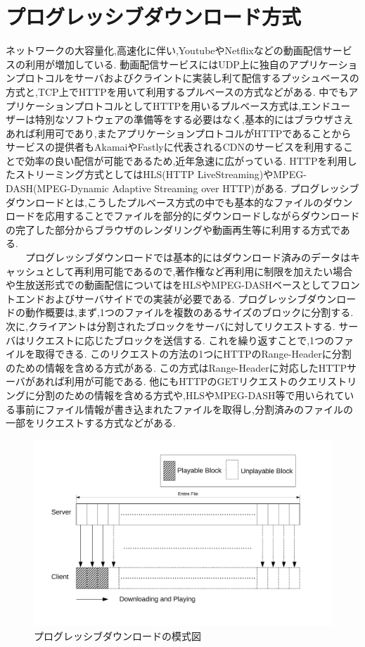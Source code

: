 \documentclass[a4j,12pt]{gradthesis_utf8}
\begin{document}
\section{プログレッシブダウンロード方式}
ネットワークの大容量化,高速化に伴い,Youtube\cite{youtube}やNetflix\cite{netflix}などの動画配信サービスの利用が増加している.
動画配信サービスにはUDP上に独自のアプリケーションプロトコルをサーバおよびクライントに実装し利て配信するプッシュベースの方式と,TCP上でHTTPを用いて利用するプルベースの方式などがある.
中でもアプリケーションプロトコルとしてHTTPを用いるプルベース方式は,エンドユーザーは特別なソフトウェアの準備等をする必要はなく,基本的にはブラウザさえあれば利用可であり,またアプリケーションプロトコルがHTTPであることからサービスの提供者もAkamaiやFastlyに代表されるCDNのサービスを利用することで効率の良い配信が可能であるため,近年急速に広がっている.
HTTPを利用したストリーミング方式としてはHLS(HTTP LiveStreaming)\cite{hls}やMPEG-DASH(MPEG-Dynamic Adaptive Streaming over HTTP)\cite{dash}がある.
プログレッシブダウンロードとは,こうしたプルベース方式の中でも基本的なファイルのダウンロードを応用することでファイルを部分的にダウンロードしながらダウンロードの完了した部分からブラウザのレンダリングや動画再生等に利用する方式である.\\
\ \ \ \ プログレッシブダウンロードでは基本的にはダウンロード済みのデータはキャッシュとして再利用可能であるので,著作権など再利用に制限を加えたい場合や生放送形式での動画配信についてはをHLSやMPEG-DASHベースとしてフロントエンドおよびサーバサイドでの実装が必要である.
プログレッシブダウンロードの動作概要は,まず,1つのファイルを複数のあるサイズのブロックに分割する.
次に,クライアントは分割されたブロックをサーバに対してリクエストする.
サーバはリクエストに応じたブロックを送信する.
これを繰り返すことで,1つのファイルを取得できる.
このリクエストの方法の1つにHTTPのRange-Headerに分割のための情報を含める方式がある.
この方式はRange-Headerに対応したHTTPサーバがあれば利用が可能である.
他にもHTTPのGETリクエストのクエリストリングに分割のための情報を含める方式や,HLSやMPEG-DASH等で用いられている事前にファイル情報が書き込まれたファイルを取得し,分割済みのファイルの一部をリクエストする方式などがある.

\begin{figure}[h]
	\centering
	\includegraphics[width=16cm]{figure/p-dl.pdf}
	\caption{プログレッシブダウンロードの模式図}
	\label{p-dl}
\end{figure}
\end{document}

